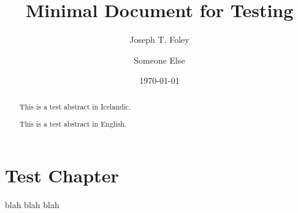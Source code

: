 \documentclass{article}
\title{Minimal Document for Testing}
\author{Joseph T. Foley \and Someone Else}
\date{\today}
\begin{document}


\maketitle

\begin{abstract}
  This is a test abstract in Icelandic.
\end{abstract}

\begin{abstract}
  This is a test abstract in English.
\end{abstract}

\newpage
\chapter{Test Chapter}
blah blah blah

\end{document}
